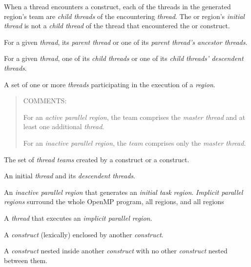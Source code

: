 \glossarydefstart
When a thread encounters a  construct, each of the threads in the 
generated  region's team are \emph{child threads} of the encountering \emph{thread}. 
The  or  region's \emph{initial thread} is not a \emph{child thread} of the thread 
that encountered the  or  construct. 
\glossarydefend

\glossarydefstart
For a given \emph{thread}, its \emph{parent thread} or one of its \emph{parent thread’s ancestor threads}.
\glossarydefend

\glossarydefstart
For a given \emph{thread}, one of its \emph{child threads} or one of 
its \emph{child threads’ descendent threads}.
\glossarydefend

\glossarydefstart
A set of one or more \emph{threads} participating in the execution of a 
\emph{region}.

\begin{quote}
COMMENTS:

For an \emph{active parallel region}, the team comprises the \emph{master thread} 
and at least one additional \emph{thread}.

For an \emph{inactive parallel region}, the \emph{team} comprises only the \emph{master thread}.
\end{quote}
\glossarydefend

\glossarydefstart
The set of \emph{thread teams} created by a  construct or a  construct.
\glossarydefend

\glossarydefstart
An initial \emph{thread} and its \emph{descendent threads}.
\glossarydefend

\glossarydefstart
An \emph{inactive parallel region} that generates an \emph{initial task region}. \emph{Implicit parallel
regions} surround the whole OpenMP program, all  regions, and all 
 regions
\glossarydefend

\glossarydefstart
A \emph{thread} that executes an \emph{implicit parallel region}.
\glossarydefend

\glossarydefstart
A \emph{construct} (lexically) enclosed by another \emph{construct}.
\glossarydefend

\glossarydefstart
A \emph{construct} nested inside another \emph{construct} with no other \emph{construct} nested 
between them.
\glossarydefend

